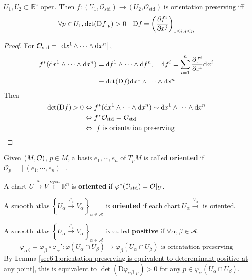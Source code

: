 \begin{lemma}\label{sec6.1:orientation preserving is equivalent to detereminant positive at any point}
     $ U_1,U_2\subset \mathbb R^n $ open. Then  $ f:(U_1,\mathcal{O}_{\mathrm{std}})\rightarrow(U_2,\mathcal{O}_{\mathrm{std}}) $ is orientation preserving iff 
    \begin{equation*}
        \forall p\in  U_1,\det(\mathrm{D}f|_p)>0\quad \mathrm{D}f=\left(\displaystyle\frac{\partial f^i}{\partial x^j}\right)_{1 \leq i,j \leq n}
    \end{equation*} 
\end{lemma}
\begin{proof}
    For  $ \mathcal{O}_{\mathrm{std}}=\left[\mathrm{d} x^1\wedge\cdots\wedge\mathrm{d} x^n\right] $,
    \begin{equation*}
        \begin{aligned}
            f^*(\mathrm{d} {x}^1\wedge\cdots\wedge\mathrm{d} {x}^n)&=\mathrm{d} {f}^1\wedge\cdots\wedge\mathrm{d} {f}^n,\quad \mathrm{d} f^i=\sum_{i=1}^n\frac{\partial f^i}{\partial x^i}\mathrm{d} x^i\\
            &=\det(\mathrm{D}f)\mathrm{d} {x}^1\wedge\cdots\wedge\mathrm{d} {x}^n
        \end{aligned}
    \end{equation*} 
    Then 
    \begin{equation*}
        \begin{aligned}
            \det(\mathrm{D}f)>0&\Leftrightarrow f^*(\mathrm{d} {x}^1\wedge\cdots\wedge\mathrm{d} {x}^n)\sim\mathrm{d} {x}^1\wedge\cdots\wedge\mathrm{d} {x}^n\\
            &\Leftrightarrow f^*\mathcal{O}_{\mathrm{std}}=\mathcal{O}_{\mathrm{std}}\\
            &\Leftrightarrow\text{ $ f $ is orientation preserving }
        \end{aligned}
    \end{equation*}
\end{proof}
Given  $ (M,\mathcal O) $,  $ p\in M $, a basis  $ e_1,\cdots,e_n $ of  $ T_pM $ is called \textbf{oriented} if  $ \mathcal{O}_p=[(e_1,\cdots,e_n)] $.

A chart  $ U\xrightarrow{\varphi}V\overset{\text{open}}{\subset}\mathbb{R}^n $ is \textbf{oriented} if  $ \varphi^*(\mathcal{O}_{\mathrm{std}})=\mathcal{O}|_U $.

A smooth atlas  $ \left\{U_\alpha\xrightarrow{\varphi_\alpha}V_\alpha\right\}_{\alpha\in\mathcal{A}} $ is \textbf{oriented} if each chart  $ U_\alpha\xrightarrow{V_\alpha} $ is oriented.

A smooth atlas  $ \left\{U_\alpha\xrightarrow{\varphi_\alpha}V_\alpha\right\}_{\alpha\in\mathcal{A}}  $ is called \textbf{positive} if  $ \forall \alpha,\beta\in\mathcal{A} $,
\[\varphi_{\alpha\beta}=\varphi_\beta\circ\varphi_\alpha':\varphi(U_\alpha\cap U_\beta)\rightarrow\varphi_\beta(U_\alpha\cap U_\beta)\text{ is orientation preserving}\] 
By Lemma \ref{sec6.1:orientation preserving is equivalent to detereminant positive at any point}, this is equivalent to  $ \det(\mathrm{D}\varphi_{\alpha\beta}|_p)>0 $ for any  $ p\in \varphi_\alpha(U_\alpha\cap U_\beta) $.

